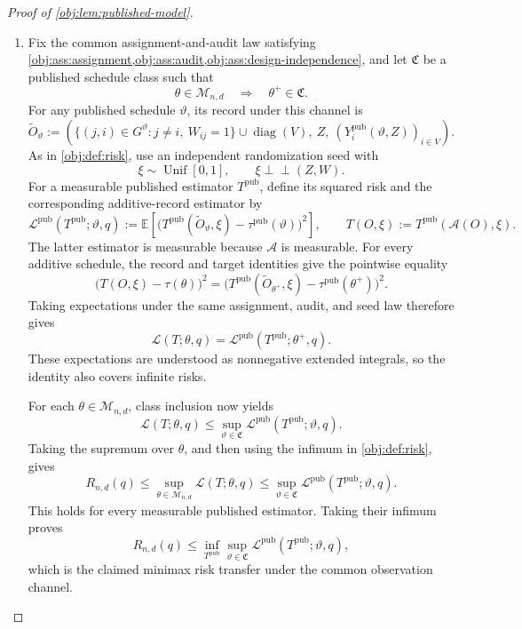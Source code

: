 \begin{proof}[Proof of \cref{obj:lem:published-model}]
\begin{enumerate}
\item Fix the common assignment-and-audit law satisfying
\cref{obj:ass:assignment,obj:ass:audit,obj:ass:design-independence},
and let \(\mathfrak C\) be a published schedule class such that
\[
\theta\in\mathcal M_{n,d}\quad\Longrightarrow\quad
\theta^+\in\mathfrak C.
\]
For any published schedule \(\vartheta\), its record under this channel is
\[
\widetilde O_\vartheta
:=
\left(
\{(j,i)\in G^\vartheta:j\ne i,\ W_{ij}=1\}
\cup\operatorname{diag}(V),
\ Z,\
(Y_i^{\mathrm{pub}}(\vartheta,Z))_{i\in V}
\right).
\]
As in \cref{obj:def:risk}, use an independent randomization seed with
\[
\xi\sim\operatorname{Unif}[0,1],
\qquad
\xi\mathbin{\perp\!\!\!\perp}(Z,W).
\]
For a measurable published estimator \(T^{\mathrm{pub}}\), define its squared risk and the corresponding additive-record estimator by
\[
\mathcal L^{\mathrm{pub}}(T^{\mathrm{pub}};\vartheta,q)
:=
\mathbb E\!\left[
\bigl(T^{\mathrm{pub}}(\widetilde O_\vartheta,\xi)
-\tau^{\mathrm{pub}}(\vartheta)\bigr)^2
\right],
\qquad
T(O,\xi):=T^{\mathrm{pub}}(\mathcal A(O),\xi).
\]
The latter estimator is measurable because \(\mathcal A\) is measurable. For every additive schedule, the record and target identities give the pointwise equality
\[
\bigl(T(O,\xi)-\tau(\theta)\bigr)^2
=
\bigl(T^{\mathrm{pub}}(\widetilde O_{\theta^+},\xi)
-\tau^{\mathrm{pub}}(\theta^+)\bigr)^2.
\]
Taking expectations under the same assignment, audit, and seed law therefore gives
\[
\mathcal L(T;\theta,q)
=
\mathcal L^{\mathrm{pub}}(T^{\mathrm{pub}};\theta^+,q).
\]
These expectations are understood as nonnegative extended integrals, so the identity also covers infinite risks.

For each \(\theta\in\mathcal M_{n,d}\), class inclusion now yields
\[
\mathcal L(T;\theta,q)
\le
\sup_{\vartheta\in\mathfrak C}
\mathcal L^{\mathrm{pub}}(T^{\mathrm{pub}};\vartheta,q).
\]
Taking the supremum over \(\theta\), and then using the infimum in
\cref{obj:def:risk}, gives
\[
R_{n,d}(q)
\le
\sup_{\theta\in\mathcal M_{n,d}}\mathcal L(T;\theta,q)
\le
\sup_{\vartheta\in\mathfrak C}
\mathcal L^{\mathrm{pub}}(T^{\mathrm{pub}};\vartheta,q).
\]
This holds for every measurable published estimator. Taking their infimum proves
\[
R_{n,d}(q)
\le
\inf_{T^{\mathrm{pub}}}
\sup_{\vartheta\in\mathfrak C}
\mathcal L^{\mathrm{pub}}(T^{\mathrm{pub}};\vartheta,q),
\]
which is the claimed minimax risk transfer under the common observation channel.
\end{enumerate}
\end{proof}

